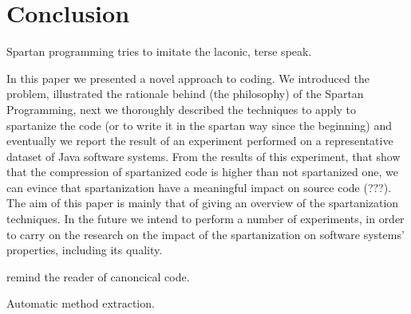 \section{Conclusion}
Spartan programming tries to imitate the laconic, terse speak.  
\label{Conclusion}

In this paper we presented a novel approach to coding. We introduced the
problem, illustrated the rationale behind (the philosophy) of the Spartan
Programming, next we thoroughly described the techniques to apply to spartanize
the code (or to write it in the spartan way since the beginning) and eventually
we report the result of an experiment performed on a representative dataset of
Java software systems.  From the results of this experiment, that show that the
compression of spartanized code is higher than not spartanized one, we can
evince that spartanization have a meaningful impact on source code (???).  The
aim of this paper is mainly that of giving an overview of the spartanization
techniques.  In the future we intend to perform a number of experiments, in
order to carry on the research on the impact of the spartanization on software
systems' properties, including its quality.

remind the reader of canoncical code.

Automatic method extraction.
